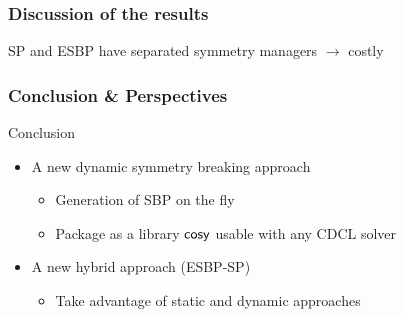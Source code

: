 \documentclass{beamer}
\begin{document}
\begin{frame}
	\frametitle{Discussion of the results}
	
	SP and ESBP have separated symmetry managers $\rightarrow$ costly
	
	\vfill
\end{frame}

\begin{frame}
\frametitle{Conclusion \& Perspectives}

	 Conclusion
	\begin{itemize}
	\item A new dynamic symmetry breaking approach
	\begin{itemize}
		\item Generation of SBP on the fly
		\item Package as a library $\textsf{cosy}$ usable with any CDCL solver
	\end{itemize}

	\item A new hybrid approach (ESBP-SP)
	\begin{itemize}
		\item Take advantage of static and dynamic approaches
	\end{itemize}
\end{itemize}
\vfill
{}
\vfill
\flushright
{}
\end{frame}
%
%
%
%
%
%
%
\end{document}
